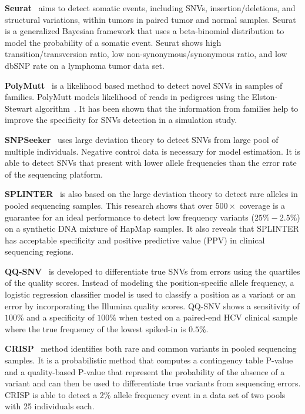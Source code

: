 \documentclass[a4,center,fleqn]{NAR}
\begin{document}
\textbf{Seurat}~\citep{Christoforides2013} aims to detect somatic events, including SNVs, insertion/deletions, and structural variations, within tumors in paired tumor and normal samples.
Seurat is a generalized Bayesian framework that uses a beta-binomial distribution to model the probability of a somatic event.
Seurat shows high transition/transversion ratio, low non-synonymous/synonymous ratio, and low dbSNP rate on a lymphoma tumor data set.

\textbf{PolyMutt}~\citep{li2012likelihood} is a likelihood based method to detect novel SNVs in samples of families.
PolyMutt models likelihood of reads in pedigrees using the Elston-Stewart algorithm~\citep{elston1971general}.
It has been shown that the information from families help to improve the specificity for SNVs detection in a simulation study.

\textbf{SNPSeeker}~\citep{Druley2009} uses large deviation theory to detect SNVs from large pool of multiple individuals.
Negative control data is necessary for model estimation.
It is able to detect SNVs that present with lower allele frequencies than the error rate of the sequencing platform.

\textbf{SPLINTER}~\citep{Spencer2014} is also based on the large deviation theory to detect rare alleles in pooled sequencing samples.
This research shows that over $500 \times$ coverage is a guarantee for an ideal performance to detect low frequency variants ($25\% - 2.5\%$) on a synthetic DNA mixture of HapMap samples.
It also reveals that SPLINTER has acceptable specificity and positive predictive value (PPV) in clinical sequencing regions.

\textbf{QQ-SNV}~\citep{VanderBorght2015} is developed to differentiate true SNVs from errors using the quartiles of the quality scores.
Instead of modeling the position-specific allele frequency, a logistic regression classifier model is used to classify a position as a variant or an error by incorporating the Illumina quality scores.
QQ-SNV shows a sensitivity of $100\%$ and a specificity of $100\%$ when tested on a paired-end HCV clinical sample where the true frequency of the lowest spiked-in is $0.5\%$.


\textbf{CRISP}~\citep{Bansal2010} method identifies both rare and common variants in pooled sequencing samples.
It is a probabilistic method that computes a contingency table P-value and a quality-based P-value that represent the probability of the absence of a variant and can then be used to differentiate true variants from sequencing errors.
CRISP is able to detect a 2\% allele frequency event in a data set of two pools with 25 individuals each.
\end{document}
